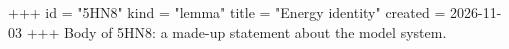 +++
id = "5HN8"
kind = "lemma"
title = "Energy identity"
created = 2026-11-03
+++
Body of 5HN8: a made-up statement about the model system.
